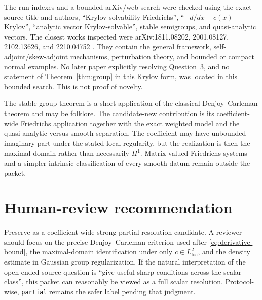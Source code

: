 \documentclass[11pt]{article}
\begin{document}
The run indexes and a bounded arXiv/web search were checked using the exact
source title and authors, ``Krylov solvability Friedrichs'',
``$-d/dx+c(x)$ Krylov'', ``analytic vector Krylov-solvable'', stable
semigroups, and quasi-analytic vectors.  The closest works inspected were
arXiv:1811.08202, 2001.08127, 2102.13626, and 2210.04752
\cite{CMNBounded,CMUnbounded,CMPerturb,CarusoNormal}.  They contain the
general framework, self-adjoint/skew-adjoint mechanisms, perturbation theory,
and bounded or compact normal examples.  No later paper explicitly resolving
Question~3, and no statement of Theorem~\ref{thm:group} in this Krylov form,
was located in this bounded search.  This is not proof of novelty.

The stable-group theorem is a short application of the classical
Denjoy--Carleman theorem and may be folklore.  The candidate-new contribution
is its coefficient-wide Friedrichs application together with the exact
weighted model and the quasi-analytic-versus-smooth separation.  The
coefficient may have unbounded imaginary part under the stated local
regularity, but the realization is then the maximal domain rather than
necessarily $H^1$.  Matrix-valued Friedrichs systems and a simpler intrinsic
classification of every smooth datum remain outside the packet.

\section*{Human-review recommendation}

Preserve as a coefficient-wide strong partial-resolution candidate.  A
reviewer should focus on the precise Denjoy--Carleman criterion used after
\eqref{eq:derivative-bound}, the maximal-domain identification under only
$c\in L^2_{\mathrm{loc}}$, and the density estimate in Gaussian group
regularization.  If the natural interpretation of the open-ended source
question is ``give useful sharp conditions across the scalar class'', this
packet can reasonably be viewed as a full scalar resolution.  Protocol-wise,
\texttt{partial} remains the safer label pending that judgment.
\end{document}
